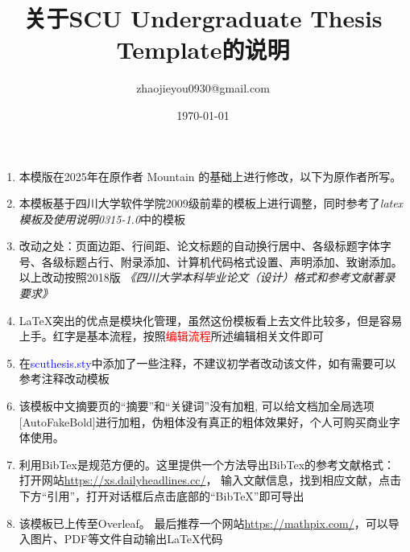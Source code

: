 \documentclass{article}
\title{\heiti 关于SCU Undergraduate Thesis Template的说明}
\author{zhaojieyou0930@gmail.com}
\date{\today}
\begin{document}
 
	\maketitle  
	
	\begin{enumerate}
        \item
        本模版在2025年在原作者 Mountain 的基础上进行修改，以下为原作者所写。
		\item 
		本模板基于四川大学软件学院2009级前辈的模板上进行调整，同时参考了\textit{latex模板及使用说明0315-1.0}中的模板
		\item
		改动之处：页面边距、行间距、论文标题的自动换行居中、各级标题字体字号、各级标题占行、附录添加、计算机代码格式设置、声明添加、致谢添加。以上改动按照2018版
		\textit{《四川大学本科毕业论文（设计）格式和参考文献著录要求》}
		\item 
		\LaTeX 突出的优点是模块化管理，虽然这份模板看上去文件比较多，但是容易上手。红字是基本流程，按照\textcolor{red}{编辑流程}所述编辑相关文件即可
		\item
		在\textcolor{blue}{scuthesis.sty}中添加了一些注释，不建议初学者改动该文件，如有需要可以参考注释改动模板
		\item 
		该模板中文摘要页的“摘要”和“关键词”没有加粗,
		可以给文档加全局选项[AutoFakeBold]进行加粗，伪粗体没有真正的粗体效果好，个人可购买商业字体使用。
		\item
		利用BibTex是规范方便的。这里提供一个方法导出BibTex的参考文献格式：打开网站\textcolor{green}{\url{https://xs.dailyheadlines.cc/}}，
		输入文献信息，找到相应文献，点击下方“引用”，打开对话框后点击底部的“BibTeX”即可导出
		\item
		该模板已上传至Overleaf。
		最后推荐一个网站\textcolor{green}{\url{https://mathpix.com/}}，可以导入图片、PDF等文件自动输出\LaTeX 代码
		
	\end{enumerate}
\end{document}

